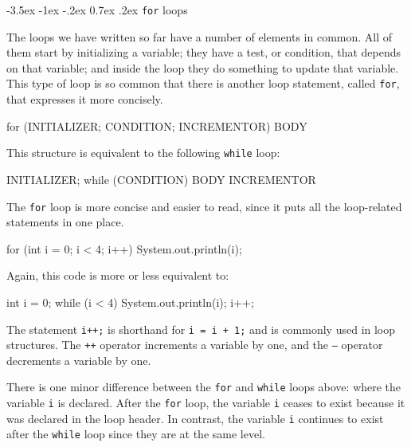 \documentclass[12pt]{book}
\makeatletter
\renewcommand{\section}{\@startsection {section}{1}{\z@}%
    {-3.5ex \@plus -1ex \@minus -.2ex}%
    {0.7ex \@plus.2ex}%
    {\normalfont\Large\bfseries}}
\theoremstyle{exercise}
\newcommand{\java}[1]{\lstinline{#1}} %
\makeatother
\begin{document}
\section{{\tt for} loops}
\label{for}


The loops we have written so far have a number of elements in common.
All of them start by initializing a variable; they have a test, or condition, that depends on that variable; and inside the loop they do something to update that variable.
This type of loop is so common that there is another loop statement, called \java{for}, that expresses it more concisely.

\begin{code}
    for (INITIALIZER; CONDITION; INCREMENTOR) {
        BODY
    }
\end{code}

This structure is equivalent to the following \java{while} loop:

\begin{code}
    INITIALIZER;
    while (CONDITION) {
        BODY
        INCREMENTOR
    }
\end{code}

The \java{for} loop is more concise and easier to read, since it puts all the loop-related statements in one place.

\begin{code}
    for (int i = 0; i < 4; i++) {
        System.out.println(i);
    }
\end{code}

Again, this code is more or less equivalent to:

\begin{code}
    int i = 0;
    while (i < 4) {
        System.out.println(i);
        i++;
    }
\end{code}

The statement {\tt i++;} is shorthand for {\tt i = i + 1;} and is commonly used in loop structures.
The {\tt ++} operator increments a variable by one, and the {\tt --} operator decrements a variable by one.

There is one minor difference between the \java{for} and \java{while} loops above: where the variable {\tt i} is declared.
After the \java{for} loop, the variable {\tt i} ceases to exist because it was declared in the loop header.
In contrast, the variable {\tt i} continues to exist after the \java{while} loop since they are at the same level.
\end{document}
